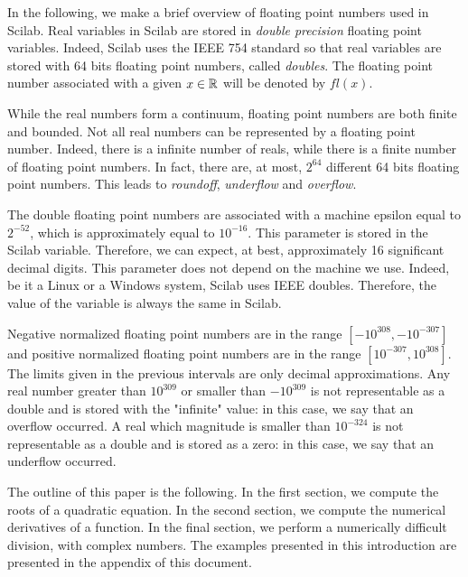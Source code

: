 In the following, we make a brief overview of floating point numbers used in Scilab.
Real variables in Scilab are stored in 
\emph{double precision} floating point variables. Indeed, Scilab uses the IEEE 754 standard so that real 
variables are stored with 64 bits floating point numbers, called \emph{doubles}.
The floating point number associated with a given $x\in\mathbb{R}$ will be 
denoted by $fl(x)$.

While the real numbers form a continuum, floating point numbers 
are both finite and bounded. Not all real numbers can be represented by a floating point number.
Indeed, there is a infinite number of reals, while there is a finite 
number of floating point numbers. 
In fact, there are, at most, $2^{64}$ different 64 bits floating point numbers. 
This leads to \emph{roundoff}, \emph{underflow} and \emph{overflow}.

The double floating point numbers are associated with a machine epsilon equal to $2^{-52}$,
which is approximately equal to $10^{-16}$. This parameter is 
stored in the  Scilab variable. Therefore, we can expect, at best, 
approximately 16 significant decimal digits. 
This parameter does not depend on the machine we use. Indeed, be it a Linux or a Windows system,
Scilab uses IEEE doubles. Therefore, the value of the  variable is always the same
in Scilab.

Negative normalized floating point numbers are in the 
range $[-10^{308},-10^{-307}]$ and positive normalized floating point numbers are in the 
range $[10^{-307},10^{308}]$. The limits given in the previous intervals 
are only decimal approximations. Any real number greater than $10^{309}$
or smaller than $-10^{309}$ is not representable as a double and is stored with the 
"infinite" value: in this case, we say that an overflow occurred. 
A real which magnitude is smaller than $10^{-324}$ is not representable as a 
double and is stored as a zero: in this case, we say that an underflow occurred.

The outline of this paper is the following. In the first section,
we compute the roots of a quadratic equation. In the second section,
we compute the numerical derivatives of a function. In the final section,
we perform a numerically difficult division, with complex numbers.
The examples presented in this introduction are presented in the 
appendix of this document.


